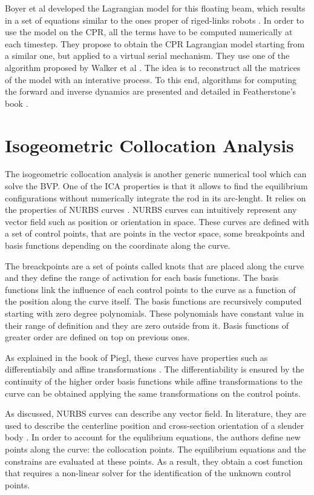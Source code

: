 \documentclass{thesisreport}
\begin{document}
 Boyer et al developed the Lagrangian model for this floating beam, which results in a set of equations similar to the ones proper of riged-links robots \cite{boyer_dynamics_2019}. In order to use the model on the CPR, all the terms have to be computed numerically at each timestep. They propose to obtain the CPR Lagrangian model starting from a similar one, but applied to a virtual serial mechanism. They use one of the algorithm proposed by Walker et al \cite{walker_efficient_1982}. The idea is to reconstruct all the matrices of the model with an interative process. To this end, algorithms for computing the forward and inverse dynamics are presented and detailed in Featherstone's book \cite{featherstone_rigid_2008}.

 
 \section{Isogeometric Collocation Analysis}
 The isogeometric collocation analysis is another generic numerical tool which can solve the BVP. One of the ICA properties is that it allows to find the equilibrium configurations without numerically integrate the rod in its arc-lenght. 
 It relies on the properties of NURBS curves \cite{piegl_nurbs_1997}. NURBS curves can intuitively represent any vector field such as position or orientation in space. These curves are defined with a set of control points, that are points in the vector space, some breakpoints and basis functions depending on the coordinate along the curve.
 
  The breackpoints are a set of points called knots that are placed along the curve and they define the range of activation for each basis functions. The basis functions link the influence of each control points to the curve as a function of the position along the curve itself. The basis functions are recursively computed starting with zero degree polynomials. These polynomials have constant value in their range of definition and they are zero outside from it. Basis functions of greater order are defined on top on previous ones. 
  
 As explained in the book of Piegl, these curves have properties such as differentiabily and affine transformations \cite{piegl_nurbs_1997}. The differentiability is ensured by the continuity of the higher order basis functions while affine transformations to the curve can be obtained applying the same transformations on the control points.
 
 As discussed, NURBS curves can describe any vector field. In literature, they are used to describe the centerline position and cross-section orientation of a slender body \cite{weeger_isogeometric_2017-1}. In order to account for the equlibrium equations, the authors define new points along the curve: the collocation points. The equilibrium equations and the constrains are evaluated at these points. As a result, they obtain a cost function that requires a non-linear solver for the identification of the unknown control points.
 
\end{document}
